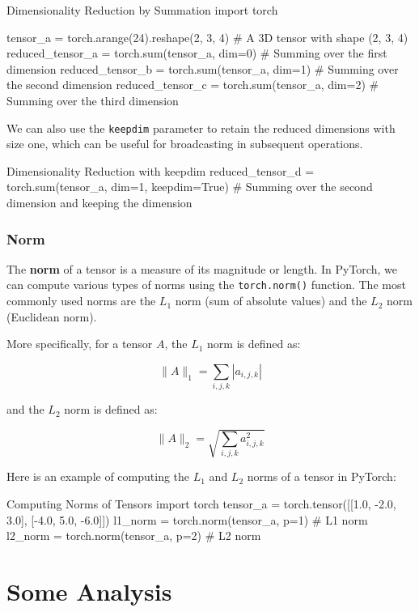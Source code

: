 \begin{pythoncode}{Dimensionality Reduction by Summation}
import torch

tensor_a = torch.arange(24).reshape(2, 3, 4)  # A 3D tensor with shape (2, 3, 4)
reduced_tensor_a = torch.sum(tensor_a, dim=0)  # Summing over the first dimension
reduced_tensor_b = torch.sum(tensor_a, dim=1)  # Summing over the second dimension
reduced_tensor_c = torch.sum(tensor_a, dim=2)  # Summing over the third dimension
\end{pythoncode}

We can also use the \texttt{keepdim} parameter to retain the reduced dimensions with size one, which can be useful for broadcasting in subsequent operations.

\begin{pythoncode}{Dimensionality Reduction with keepdim}
reduced_tensor_d = torch.sum(tensor_a, dim=1, keepdim=True)  # Summing over the second dimension and keeping the dimension
\end{pythoncode}

\subsubsection{Norm}

The \textbf{norm} of a tensor is a measure of its magnitude or length. In PyTorch, we can compute various types of norms using the \texttt{torch.norm()} function. The most commonly used norms are the \(L_1\) norm (sum of absolute values) and the \(L_2\) norm (Euclidean norm).

More specifically, for a tensor \(A\), the \(L_1\) norm is defined as:

\[\|A\|_1 = \sum_{i,j,k} |a_{i,j,k}|\]

and the \(L_2\) norm is defined as:

\[\|A\|_2 = \sqrt{\sum_{i,j,k} a_{i,j,k}^2}\]

Here is an example of computing the \(L_1\) and \(L_2\) norms of a tensor in PyTorch:

\begin{pythoncode}{Computing Norms of Tensors}
import torch
tensor_a = torch.tensor([[1.0, -2.0, 3.0], [-4.0, 5.0, -6.0]])
l1_norm = torch.norm(tensor_a, p=1)  # L1 norm
l2_norm = torch.norm(tensor_a, p=2)  # L2 norm
\end{pythoncode}

\section{Some Analysis}

